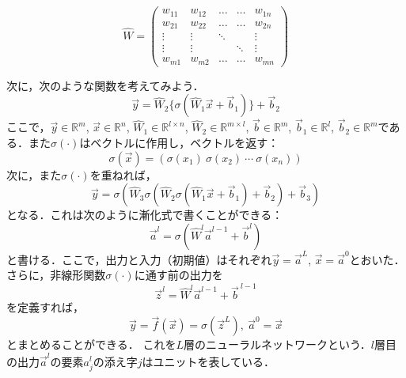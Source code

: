 \begin{equation}
     \hat{W}=
     \left(
        \begin{array}{ccccc}
       w_{11}&w_{12}& \dots  & \dots& w_{1n}\\[5pt]
       w_{21}&w_{22}& \dots  & \dots& w_{2n}\\[5pt]
      \vdots&\vdots&\ddots &  & \vdots\\[5pt]
      \vdots&\vdots& &\ddots  & \vdots\\[5pt]
       w_{m1}&w_{m2}& \dots  & \dots& w_{mn}
        \end{array}
        \right)
\end{equation}

次に，次のような関数を考えてみよう．
\begin{equation}
    \vec{y} = \hat{W}_2\{\sigma(\hat{W}_1\vec{x}+\vec{b}_1)\} + \vec{b}_2
\end{equation}
ここで，$\vec{y}\in\mathbb{R}^m$, $\vec{x}\in\mathbb{R}^n$, $\hat{W}_1\in\mathbb{R}^{l\times n}$, $\hat{W}_2\in\mathbb{R}^{m\times l}$, $\vec{b}\in\mathbb{R}^m$, $\vec{b}_1\in\mathbb{R}^l$, $\vec{b}_2\in\mathbb{R}^m$である．また$\sigma(\cdot)$はベクトルに作用し，ベクトルを返す：
\begin{equation}
    \sigma(\vec{x}) = (\sigma(x_1)\ \sigma(x_2)\ \cdots\ \sigma(x_n))
\end{equation}
次に，また$\sigma(\cdot)$を重ねれば，
\begin{equation}
   \vec{y} = \sigma(\hat{W}_3\sigma(\hat{W}_2\sigma(\hat{W}_1\vec{x}+\vec{b}_1) + \vec{b}_2)+\vec{b}_3)
\end{equation}
となる．これは次のように漸化式で書くことができる：
\begin{equation}
    \vec{a}^{l} = \sigma(\hat{W}^{l}\vec{a}^{l-1} + \vec{b}^{l})
\end{equation}
と書ける．ここで，出力と入力（初期値）はそれぞれ$\vec{y}=\vec{a}^{L}$, $\vec{x}=\vec{a}^{0}$とおいた．さらに，非線形関数$\sigma(\cdot)$に通す前の出力を
\begin{equation}
    \vec{z}^{l} = \hat{W}^{l} \vec{a}^{l-1} + \vec{b}^{\ l-1}
\end{equation}
を定義すれば，
\begin{equation}
    \vec{y}=\vec{f}(\vec{x}) = \sigma(\vec{z}^{L}),\ \vec{a}^{0} = \vec{x}
\end{equation}
とまとめることができる．
これを$L$層のニューラルネットワークという．$l$層目の出力$\vec{a}^{l}$の要素$a_j^{l}$の添え字$j$はユニットを表している．

